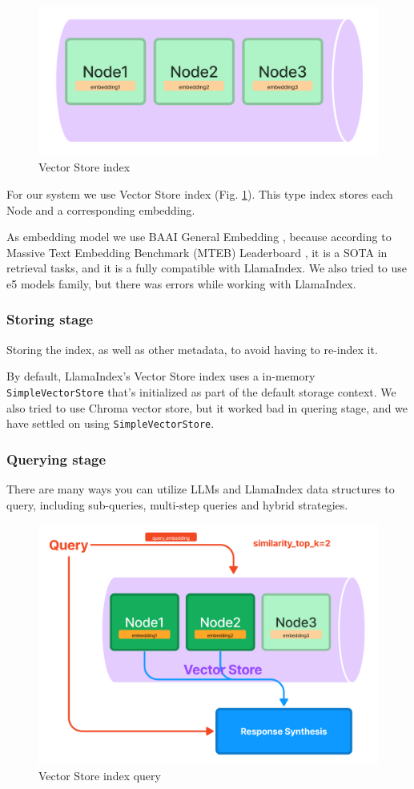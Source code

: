 \documentclass[conference, 11pt]{IEEEtran}
\begin{document}
\begin{figure}[h]
\centering
\includegraphics[width=0.8\linewidth]{vector_store.png}
\caption{Vector Store index}
\label{fig:vector_store}
\end{figure}

For our system we use Vector Store index (Fig. \ref{fig:vector_store}). This type index stores each Node and a corresponding embedding.

As embedding model we use BAAI General Embedding \cite{bge}, because according to Massive Text Embedding Benchmark (MTEB) Leaderboard \cite{mteb}, it is a SOTA in retrieval tasks, and it is a fully compatible with LlamaIndex. We also tried to use e5 models family, but there was errors while working with LlamaIndex.

\subsubsection{Storing stage}
Storing the index, as well as other metadata, to avoid having to re-index it.

By default, LlamaIndex's Vector Store index uses a in-memory \texttt{SimpleVectorStore} that’s initialized as part of the default storage context. We also tried to use Chroma vector store, but it worked bad in quering stage, and we have settled on using \texttt{SimpleVectorStore}.

\subsubsection{Querying stage}
There are many ways you can utilize LLMs and LlamaIndex data structures to query, including sub-queries, multi-step queries and hybrid strategies.

\begin{figure}[h]
\centering
\includegraphics[width=0.8\linewidth]{vector_store_query.png}
\caption{Vector Store index query}
\end{figure}
\end{document}
